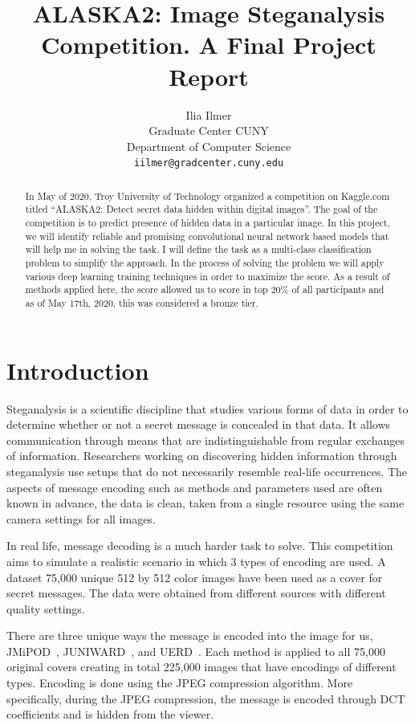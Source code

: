 \documentclass[letterpaper]{article}
\title{ALASKA2: Image Steganalysis Competition. A Final Project Report}
\author{
    Ilia Ilmer \\
  Graduate Center CUNY \\
  Department of Computer Science \\
  \texttt{iilmer@gradcenter.cuny.edu} \\
}
\begin{document}
\maketitle
\begin{abstract}
    In May of 2020, Troy University of Technology organized a competition on Kaggle.com titled ``ALASKA2: Detect secret data hidden within digital images''. The goal of the competition is to predict presence of hidden data in a particular image.
    In this project, we will identify reliable and promising convolutional neural network based models that will help me in solving the task. I will define the task as a multi-class classification problem to simplify the approach. In the process of solving the problem we will apply various deep learning training techniques in order to maximize the score. As a result of methods applied here, the score allowed us to score in top 20\% of all participants and as of May 17th, 2020, this was considered a bronze tier.
\end{abstract}

\section{Introduction}

Steganalysis is a scientific discipline that studies various forms of data in order to determine whether or not a secret message is concealed in that data. It allows communication through means that are indistinguishable from regular exchanges of information. Researchers working on discovering hidden information through steganalysis use setups that do not necessarily resemble real-life occurrences. The aspects of message encoding such as methods and parameters used are often known in advance, the data is clean, taken from a single resource using the same camera settings for all images.

In real life, message decoding is a much harder task to solve. This competition aims to simulate a realistic scenario in which 3 types of encoding are used. A dataset 75,000 unique 512 by 512 color images have been used as a cover for secret messages. The data were obtained from different sources with different quality settings.

There are three unique ways the message is encoded into the image for us, JMiPOD~\cite{jmipod}, JUNIWARD~\cite{juniward}, and UERD~\cite{uerd}. Each method is applied to all 75,000 original covers creating in total 225,000 images that have encodings of different types. Encoding is done using the JPEG compression algorithm. More specifically, during the JPEG compression, the message is encoded through DCT coefficients and is hidden from the viewer.
\end{document}
